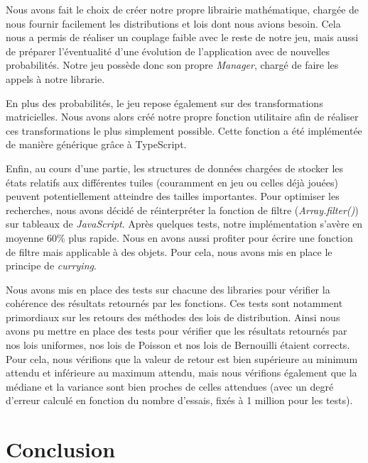 \documentclass[a4paper, 12pt]{report}
\begin{document}
\tabto{1cm}Nous avons fait le choix de créer notre propre librairie mathématique, chargée de nous fournir facilement les distributions et lois
dont nous avions besoin. Cela nous a permis de réaliser un couplage faible avec le reste de notre jeu, mais aussi de préparer
l'éventualité d'une évolution de l'application avec de nouvelles probabilités. Notre jeu possède donc son propre \textit{Manager}, chargé 
de faire les appels à notre librarie.

\vspace{0.5cm}

\tabto{1cm}En plus des probabilités, le jeu repose également sur des transformations
matricielles. Nous avons alors créé notre propre fonction utilitaire afin de réaliser ces transformations le plus
simplement possible. Cette fonction a été implémentée de manière générique grâce à TypeScript.

\vspace{0.5cm}

\tabto{1cm}Enfin, au cours d'une partie, les structures de données chargées de stocker les états relatifs aux différentes tuiles
(couramment en jeu ou celles déjà jouées) peuvent potentiellement atteindre des tailles importantes. Pour optimiser les recherches, 
nous avons décidé de réinterpréter la fonction de filtre (\textit{Array.filter()}) sur tableaux de \textit{JavaScript}.
Après quelques tests, notre implémentation s'avère en moyenne 60\% plus rapide. Nous en avons aussi profiter pour écrire une fonction
de filtre mais applicable à des objets. Pour cela, nous avons mis en place le principe de \textit{currying}.

\vspace{0.5cm}

\tabto{1cm}Nous avons mis en place des tests sur chacune des libraries pour vérifier la cohérence des résultats retournés par les fonctions.
Ces tests sont notamment primordiaux sur les retours des méthodes des lois de distribution. Ainsi nous avons pu mettre en place des tests pour
vérifier que les résultats retournés par nos lois uniformes, nos lois de Poisson et nos lois de Bernouilli étaient corrects. Pour cela, nous
vérifions que la valeur de retour est bien supérieure au minimum attendu et inférieure au maximum attendu, mais nous vérifions également que la 
médiane et la variance sont bien proches de celles attendues (avec un degré d'erreur calculé en fonction du nombre d'essais, fixés à 1 million pour les tests).

\chapter{Conclusion}
\end{document}
